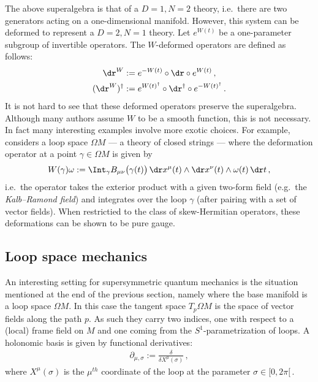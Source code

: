     The above superalgebra is that of a $D=1,N=2$ theory, i.e.~there are two generators acting on a one-dimensional manifold. However, this system can be deformed to represent a $D=2,N=1$ theory. Let $e^{W(t)}$ be a one-parameter subgroup of invertible operators. The $W$-deformed operators are defined as follows:
    \begin{align}
        \dr^W &:= e^{-W(t)}\circ\dr\circ e^{W(t)}\,,\\
        (\dr^W)^\dagger &:= e^{W(t)^\dagger}\circ\dr^\dagger\circ e^{-W(t)^\dagger}\,.
    \end{align}
    It is not hard to see that these deformed operators preserve the superalgebra. Although many authors assume $W$ to be a smooth function, this is not necessary. In fact many interesting examples involve more exotic choices. For example, \citet{schreiber_loop_2005} considers a loop space $\Omega M$ --- a theory of closed strings --- where the deformation operator at a point $\gamma\in\Omega M$ is given by
    \begin{gather}
        W(\gamma)\omega := \Int_\gamma B_{\mu\nu}\bigl(\gamma(t)\bigr)\,\dr x^\mu(t)\wedge\dr x^\nu(t)\wedge\omega(t)\,\dr t\,,
    \end{gather}
    i.e.~the operator takes the exterior product with a given two-form field (e.g.~the \textit{Kalb--Ramond field}) and integrates over the loop $\gamma$ (after pairing with a set of vector fields). When restrictied to the class of skew-Hermitian operators, these deformations can be shown to be pure gauge.

\subsection{Loop space mechanics}

    An interesting setting for supersymmetric quantum mechanics is the situation mentioned at the end of the previous section, namely where the base manifold is a loop space $\Omega M$. In this case the tangent space $T_p\Omega M$ is the space of vector fields along the path $p$. As such they carry two indices, one with respect to a (local) frame field on $M$ and one coming from the $S^1$-parametrization of loops. A holonomic basis is given by functional derivatives:
    \begin{gather}
        \partial_{\mu,\sigma} := \frac{\delta}{\delta X^\mu(\sigma)}\,,
    \end{gather}
    where $X^\mu(\sigma)$ is the $\mu^{th}$ coordinate of the loop at the parameter $\sigma\in[0,2\pi[\,$.

